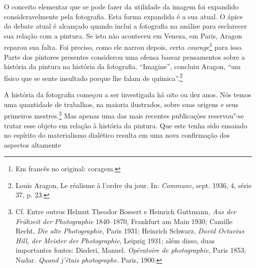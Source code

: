 O conceito elementar que se pode fazer da utilidade da imagem foi
expandido consideravelmente pela fotografia. Esta forma expandida é a
sua atual. O ápice do debate atual é alcançado quando inclui a
fotografia na análise para esclarecer sua relação com a pintura. Se isto
não aconteceu em Veneza, em Paris, Aragon reparou sua falta. Foi
preciso, como ele narrou depois, certa \emph{courage}\footnote{Em
  francês no original: coragem. \versal{[N. T.]}} para isso. Parte dos pintores presentes
considerou uma ofensa basear pensamentos sobre a história da pintura na
história da fotografia. ``Imagine'', concluiu Aragon, ``um físico que se
sente insultado porque lhe falam de química''.\footnote{Louis Aragon, Le
  réalisme à l'ordre du jour. In: \emph{Commune}, sept. 1936, 4, série
  37, p. 23.}

A história da fotografia começou a ser investigada há oito ou dez anos.
Nós temos uma quantidade de trabalhos, na maioria ilustrados, sobre suas
origens e seus primeiros mestres.\footnote{Cf. Entre outros Helmut
  Theodor Bossert e Heinrich Guttmann, \emph{Aus der Frühzeit der
  Photographie} 1840--1870, Frankfurt am Main 1930; Camille Recht,
  \emph{Die alte Photographie}, Paris 1931; Heinrich Schwarz,
  \emph{David Octavius Hill, der Meister der Photographie}, Leipzig
  1931; além disso, duas importantes fontes: Disderi, Manuel.
  \emph{Opératoire de photographie}, Paris 1853; Nadar. \emph{Quand
  j'étais photographe}. Paris, 1900.} Mas apenas uma das mais recentes
publicações reservou"-se tratar esse objeto em relação à história da
pintura. Que este tenha sido ensaiado no espírito do materialismo
dialético resulta em uma nova confirmação dos aspectos altamente
